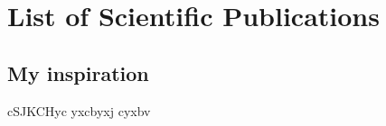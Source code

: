 \chapter{List of Scientific Publications}
\label{app:complete_pub_list}

\section{My inspiration}

cSJKCHyc yxcbyxj cyxbv 